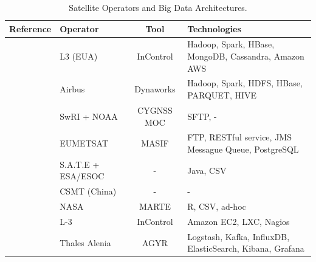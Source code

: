 \begin{table}[H]
  \begin{center}
    \caption{Satellite Operators and Big Data Architectures.}\label{table:bigdataoperators}
    \begin{tabular}{|C{11em}|C{6em}|c|C{10em}|}
      \hline
      \bfseries Reference                           & \bfseries Operator & \bfseries Tool & \bfseries Technologies                                                                \\
      \hline
      \cite{adamskiDataAnalyticsLarge2016}           & L3 (EUA)           & InControl            & Hadoop, Spark, HBase, MongoDB, Cassandra, Amazon AWS                                 \\
      \hline
      \cite{boussoufBigDataBased2018}                & Airbus             & Dynaworks            & Hadoop, Spark, HDFS, HBase, PARQUET, HIVE                                            \\
      \hline
      \cite{dischnerMeetingChallengeConstellation2016}            & SwRI + NOAA        & CYGNSS MOC           & SFTP, -                                                                              \\
      \hline
      \cite{edwardsDealingBigData2018}               & EUMETSAT           & MASIF                & FTP, RESTful service, JMS Messague Queue, PostgreSQL                                 \\
      \hline
      \cite{evansDataMiningDrastically2016}          & S.A.T.E + ESA/ESOC & -                    & Java, CSV                                                                            \\
      \hline
      \cite{fenManagementOperationCommunication2016} & CSMT (China)       & -                    & - \\
      \hline
      \cite{fernandezTelemetryAnomalyDetection2017}  & NASA               & MARTE                & R, CSV, ad-hoc                                                                       \\
      \hline
      \cite{gillesFlyingLargeConstellations2016}     & L-3                & InControl            & Amazon EC2, LXC, Nagios                                                              \\
      \hline
      \cite{hennionBigdataSatelliteYearly2018}       & Thales Alenia      & AGYR                 & Logstash, Kafka, InfluxDB, ElasticSearch, Kibana, Grafana                            \\

\end{tabular}
\end{center}
\end{table}
